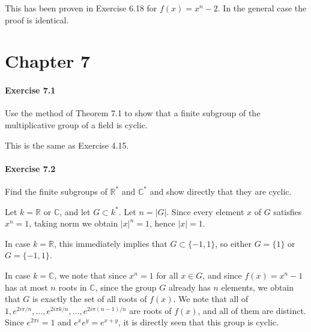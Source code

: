 \documentclass[notitlepage]{article}
\theoremstyle{definition}
\newcommand\C{\mathbb{C}}
\newcommand\R{\mathbb{R}}
\begin{document}
This has been proven in Exercise 6.18 for $f(x) = x^n - 2$. In the
general case the proof is identical.

\section{Chapter 7}
\paragraph{Exercise 7.1}
Use the method of Theorem 7.1 to show that a finite subgroup of the
multiplicative group of a field is cyclic.

This is the same as Exercise 4.15.

\paragraph{Exercise 7.2}
Find the finite subgroups of $\R^*$ and $\C^*$ and show directly that
they are cyclic.

Let $k = \R$ or $\C$, and let $G \subset k^*$. Let $n = |G|$. Since
every element $x$ of $G$ satisfies $x^n = 1$, taking norm we obtain
$|x|^n = 1$, hence $|x| = 1$.

In case $k = \R$, this immediately
implies that $G \subset \{-1, 1\}$, so either $G = \{ 1 \}$ or
$G = \{ -1, 1 \}$.

In case $k = \C$, we note that since $x^n = 1$ for all $x \in G$, and
since $f(x) = x^n - 1$ has at most $n$ roots in $\C$, since the group
$G$ already has $n$ elements, we obtain that $G$ is exactly the set of
all roots of $f(x)$. We note that all of
$1, e^{2i\pi/n}, \ldots, e^{2 i\pi k/n}, \ldots, e^{2 i \pi (n-1)/n}$
are roots of $f(x)$, and all of them are distinct. Since
$e^{2 \pi i} = 1$ and $e^x e^y = e^{x+y}$, it is directly seen that
this group is cyclic.
\end{document}
